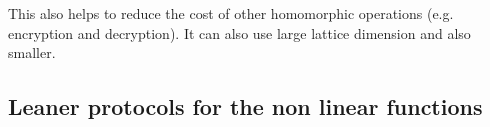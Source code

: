 \documentclass[../thesis.tex]{subfiles}
\begin{document}
This also helps to reduce the cost of other homomorphic operations (e.g. encryption and decryption). It can also use large lattice dimension and also smaller. 

\subsection{Leaner protocols for the non linear functions}







\end{document}

